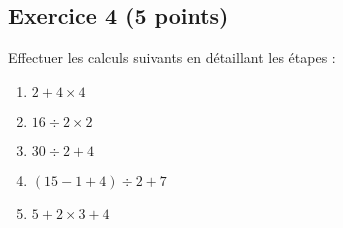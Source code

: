 \documentclass[14 pt]{extarticle}
\theoremstyle{plain}
\begin{document}
 
 \subsection*{Exercice 4 (5 points)}
 
 Effectuer les calculs suivants en détaillant les étapes : 
 \begin{enumerate}
 \item $2 + 4 \times 4$
 \item $ 16 \div 2 \times 2$
 \item $ 30 \div 2 + 4$
 \item $ (15 - 1 + 4) \div 2 + 7$
 \item $ 5 + 2 \times 3 + 4$
 \end{enumerate} 
 
 	
\end{document}
